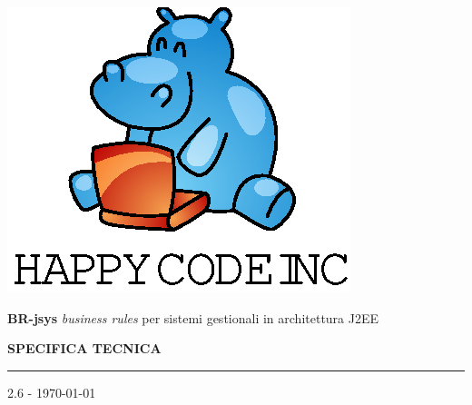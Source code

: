\documentclass[11pt,titlepage,a4paper]{report}
\begin{document}
\newcommand{\lv}{0.4} %
\newcommand{\Glossario}{ Glossario.1.4.pdf }


\begin{titlepage}
\begin{center}
\vspace*{0.5in}
\includegraphics{logo.eps}
\vspace*{0.2in}

{\Large \textbf{BR-jsys}}
{\Large \emph{business rules} per sistemi gestionali in architettura J2EE } 
\vspace{2in}

\LARGE \textbf {SPECIFICA TECNICA}
\par\rule{10cm}{0.4pt} \par {\Large 2.6 - \today}


\end{center}
\end{titlepage}
\vspace*{0.5in}
\end{document}
